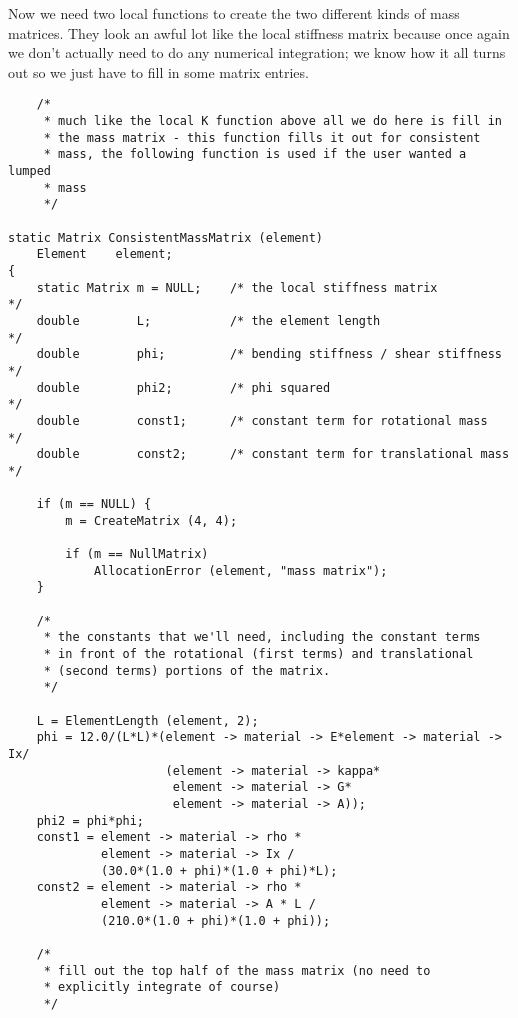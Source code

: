 Now we need two local functions to create the two different kinds of
mass matrices.  They look an awful lot like the local stiffness matrix
because once again we don't actually need to do any numerical integration;
we know how it all turns out so we just have to fill in some matrix entries.

\begin{screen}
 \begin{verbatim}
	/* 
	 * much like the local K function above all we do here is fill in
	 * the mass matrix - this function fills it out for consistent
	 * mass, the following function is used if the user wanted a lumped
	 * mass
	 */

static Matrix ConsistentMassMatrix (element)
    Element	   element;
{
    static Matrix m = NULL;    /* the local stiffness matrix           */
    double        L;           /* the element length                   */
    double        phi;         /* bending stiffness / shear stiffness  */
    double        phi2;        /* phi squared                          */
    double        const1;      /* constant term for rotational mass    */
    double        const2;      /* constant term for translational mass */

    if (m == NULL) {
        m = CreateMatrix (4, 4);

        if (m == NullMatrix)
            AllocationError (element, "mass matrix");
    }

	/*
	 * the constants that we'll need, including the constant terms
	 * in front of the rotational (first terms) and translational
	 * (second terms) portions of the matrix.
	 */

    L = ElementLength (element, 2);
    phi = 12.0/(L*L)*(element -> material -> E*element -> material -> Ix/
                      (element -> material -> kappa*
                       element -> material -> G*
                       element -> material -> A));
    phi2 = phi*phi;
    const1 = element -> material -> rho * 
             element -> material -> Ix /
             (30.0*(1.0 + phi)*(1.0 + phi)*L);
    const2 = element -> material -> rho * 
             element -> material -> A * L /
             (210.0*(1.0 + phi)*(1.0 + phi));

	/*
	 * fill out the top half of the mass matrix (no need to 
	 * explicitly integrate of course)
	 */


\end{verbatim}
\end{screen}
